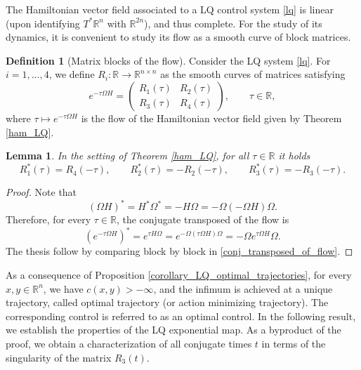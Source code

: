 \documentclass[reqno]{amsart}
\theoremstyle{plain}
\newtheorem{lem}[thm]{Lemma}
\theoremstyle{definition}
\newtheorem{Def}[thm]{Definition}
\theoremstyle{remark}
\newcommand{\R}{\mathbb{R}}
\begin{document}
    The Hamiltonian vector field associated to a LQ control system \eqref{lq} is linear (upon identifying $T^*\mathbb{R}^n$ with $\mathbb{R}^{2n}$), and thus complete. For the study of its dynamics, it is convenient to study its flow as a smooth curve of block matrices.
\begin{Def}[Matrix blocks of the flow]\label{blocks_R_i}
    Consider the LQ system \eqref{lq}. For $i=1,\ldots,4$, we define $R_i:\mathbb{R}\to\mathbb{R}^{n\times n}$ as the smooth curves of matrices satisfying 
    \begin{equation}\label{formula_R_i}
			e^{-\tau\Omega H}=\begin{pmatrix}
				R_1(\tau) & R_2(\tau)\\
				R_3(\tau) & R_4(\tau)
			\end{pmatrix},\qquad \tau\in\mathbb{R},
		\end{equation}
    where $\tau\mapsto e^{-\tau\Omega H}$ is the flow of the Hamiltonian vector field given by Theorem \ref{ham_LQ}.
\end{Def}
  \begin{lem}\label{time_reflection_symmetry}
        In the setting of Theorem \ref{ham_LQ}, for all $\tau \in \R$ it holds
        \begin{equation}
		R_1^*(\tau)=R_4(-\tau),\qquad R_2^*(\tau)=-R_2(-\tau),\qquad R_3^*(\tau)=-R_3(-\tau).
	\end{equation}
    \end{lem} 
    \begin{proof} Note that
    \begin{equation} 
		(\Omega H)^*=H^*\Omega^*=-H\Omega=-\Omega(-\Omega H)\Omega.
	\end{equation}
    Therefore, for every $\tau\in\mathbb{R}$, the conjugate transposed of the flow is 
    \begin{equation}\label{conj_transposed_of_flow}
        \left(e^{-\tau\Omega H}\right)^*
		=e^{\tau H\Omega}
		=e^{-\Omega(\tau\Omega H)\Omega}
		=-\Omega e^{\tau\Omega H}\Omega.
    \end{equation}
    The thesis follow by comparing block by block in  \eqref{conj_transposed_of_flow}.
    \end{proof}

  

    As a consequence of Proposition \ref{corollary_LQ_optimal_trajectories}, for every $x,y\in\mathbb{R}^n$, we have $c(x,y)>-\infty$, and the infimum is achieved at a unique trajectory, called optimal trajectory (or action minimizing trajectory).  The corresponding control is referred to as an optimal control. In the following result, we establish the properties of the LQ exponential map. As a byproduct of the proof, we obtain a characterization of all conjugate times $t$ in terms of the singularity of the matrix $R_3(t)$.
\end{document}

